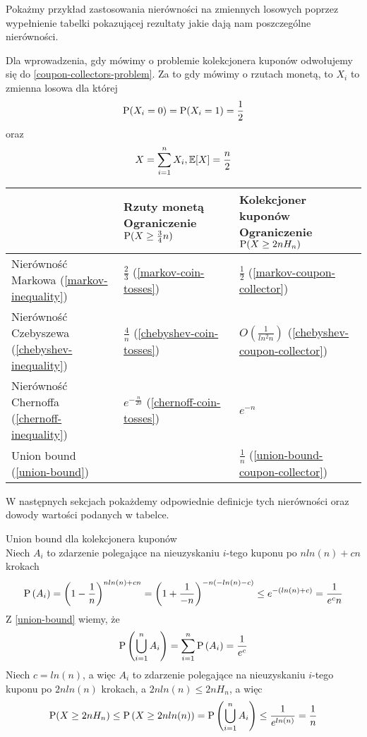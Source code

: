 Pokażmy przykład zastosowania nierówności na zmiennych losowych poprzez wypełnienie tabelki pokazującej rezultaty jakie dają nam poszczególne nierówności.

Dla wprowadzenia, gdy mówimy o problemie kolekcjonera kuponów odwołujemy się do \ref{coupon-collectors-problem}. Za to gdy mówimy o rzutach monetą, to \(X_i\) to zmienna losowa dla której 
\[
	\operatorname{P}(X_i = 0) = \operatorname{P}(X_i = 1) = \frac{1}{2}
\]
oraz
\[
	X = \sum_{i=1}^n X_i, \ev{X} = \frac{n}{2}
\]

\begin{tabular}{p{6cm} p{5.5cm} p{5.5cm}}
\toprule
 & Rzuty monetą \newline Ograniczenie \(\operatorname{P}(X \geq \frac{3}{4}n)\)  & Kolekcjoner kuponów \newline Ograniczenie \(\operatorname{P}(X \geq 2 n H_n)\)\\
\midrule
Nierówność Markowa (\ref{markov-inequality}) & \(\frac{2}{3}\) (\ref{markov-coin-tosses}) & \(\frac{1}{2}\) (\ref{markov-coupon-collector}) \\

Nierówność Czebyszewa (\ref{chebyshev-inequality}) & \(\frac{4}{n}\) (\ref{chebyshev-coin-tosses}) & \(O(\frac{1}{ln^2 n})\) (\ref{chebyshev-coupon-collector})\\

Nierówność Chernoffa (\ref{chernoff-inequality}) & \(e^{-\frac{n}{20}}\) (\ref{chernoff-coin-tosses})& \(e^{-n}\) \\

Union bound (\ref{union-bound}) & \(\) & \(\frac{1}{n}\) (\ref{union-bound-coupon-collector}) \\
\bottomrule
\end{tabular}

W następnych sekcjach pokażdemy odpowiednie definicje tych nierówności oraz dowody wartości podanych w tabelce.

\begin{example} Union bound dla kolekcjonera kuponów\\
	\label{union-bound-coupon-collector}
	Niech \(A_i\) to zdarzenie polegające na nieuzyskaniu \(i\)-tego kuponu po \(n ln(n) + cn\) krokach
	\[
		\operatorname{P}\left(A_i\right) = \left(1 - \frac{1}{n}\right)^{n ln(n) + cn} = \left(1 + \frac{1}{-n}\right)^{-n(-ln(n) -c)} \leq e^{-(ln(n) + c)} = \frac{1}{e^c n}
	\]
	Z \ref{union-bound} wiemy, że
	\[
		\operatorname{P}\left(\bigcup_{i=1}^n A_i\right) = \sum_{i=1}^n \operatorname{P}\left(A_i\right) = \frac{1}{e^c}
	\]
	Niech \(c = ln(n)\), a więc \(A_i\) to zdarzenie polegające na nieuzyskaniu \(i\)-tego kuponu po \(2n ln(n)\) krokach, a \(2n ln(n) \leq 2n H_n\), a więc
	\[
		\operatorname{P}(X \geq 2n H_n) \leq \operatorname{P}\left(X \geq 2n ln(n)\right) = \operatorname{P}\left(\bigcup_{i=1}^n A_i\right) \leq \frac{1}{e^{ln(n)}} = \frac{1}{n}
	\]
\end{example}